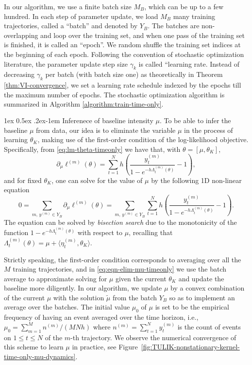 \documentclass[11pt]{article}
\makeatletter
\theoremstyle{remark}
\theoremstyle{plain}
\renewcommand{\paragraph}{%
  \@startsection{paragraph}{4}%
  {\z@}{1ex \@plus 0.5ex \@minus .2ex}{-1em}%
  {\normalfont\normalsize\itshape}%
}
\makeatother
\begin{document}
In our algorithm, we use a finite batch size $M_B$, which can be up to a few hundred. 
In each step of parameter update, we load $M_B$ many training trajectories, called a ``batch'' and denoted by $Y_B$. The batches are non-overlapping and loop over the training set, and when one pass of the training set is finished, it is called an ``epoch''. We random shuffle the training set indices at the beginning of each epoch. 
Following the convention of stochastic optimization literature, the parameter update step size $\gamma_k$ is called ``learning rate. Instead of decreasing $\gamma_k$ per batch (with batch size one) as theoretically in Theorem \ref{thm:VI-convergence}, we set a learning rate schedule indexed by the epochs till the maximum number of epochs. 
The stochastic optimization algorithm is summarized in Algorithm \ref{algorithm:train-time-only}.


\paragraph{Inferenece of baseline intensity $\mu$.}
To be able to infer the baseline $\mu$ from data, our idea is to eliminate the variable $\mu$ in the process of learning $\theta_K$, making use of the first-order condition of the log-likelihood objective.
Specifically, from \eqref{eq:lm-theta-timeonly} we have that, with $\theta = [\mu, \theta_K]$,
\begin{equation*}
\partial_\mu \ell^{(m)}( \theta)
= \sum_{t=1}^N  h \left(  \frac{   y_t^{(m)}   }{ 1- e^{-  h  \Lambda_t^{(m)}( \theta) }}   -1 \right),
\end{equation*}
and for fixed $\theta_K$, one can solve for the value of $\mu$ by the following 1D non-linear equation
\begin{equation}\label{eq:eqn-elim-mu-timeonly}
0 
= \sum_{m, \, y^{(m)} \in Y_B} \partial_\mu \ell^{(m)}( \theta)
=  \sum_{m, \, y^{(m)} \in Y_B}  \sum_{t=1}^N  h \left(  \frac{   y_t^{(m)}   }{ 1- e^{-  h  \Lambda_t^{(m)}( \theta) }}  -1 \right).
\end{equation}
The equation can be solved by {\it bisection search} due to the monotonicity of the function $1- e^{-  h  \Lambda_t^{(m)}( \theta) } $ with respect to $\mu$, recalling that $\Lambda_t^{(m)}( \theta)  = \mu + \langle \eta_t^{(m)}, \theta_K \rangle$. 
%


Strictly speaking, the first-order condition corresponds to averaging over all the $M$ training trajectories, and in \eqref{eq:eqn-elim-mu-timeonly} we use the batch average to approximate solving for $\mu$ given the current $\theta_K$ and update the baseline more diligently. 
%
In our algorithm, we update $\mu$ by a convex combination of the current $\mu$ with the solution $\tilde \mu$ from the batch $Y_B$ so as to implement an average over the batches. 
The initial value $\mu_0$ of $\mu$ is set to be the empirical frequency of having an event averaged over the time horizon, i.e., 
$\mu_0 = \sum_{m=1}^M n^{(m)}/(MNh)$ where $n^{(m)} = \sum_{t=1}^N y^{(m)}_t$ is the count of events on $ 1 \le t \le N$ of the $m$-th trajectory.
We observe the numerical convergence of this scheme to learn $\mu$ in practice, 
see Figure~\ref{fig:TULIK-nonstationary-kernel-time-only-mu-dynamics}.
\end{document}
